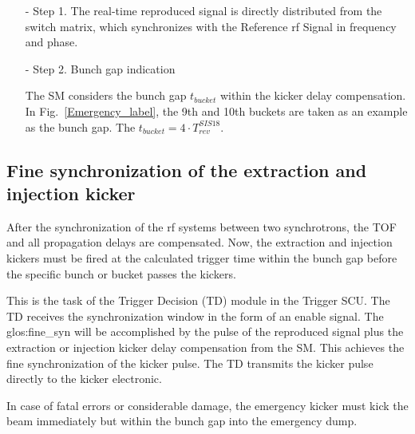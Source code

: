 \begin{itemize}
\begin{itemize}
\item[-] Step 1. The real-time reproduced signal is directly distributed from the switch matrix, which synchronizes with the Reference rf Signal in frequency and phase.
\item[-] Step 2. Bunch gap indication

The SM considers the bunch gap $t_{\mathit{bucket}}$ within the kicker delay compensation. In Fig.~\ref{Emergency_label}, the 9th and 10th buckets are taken as an example as the bunch gap. The $t_{\mathit{bucket}}=4\cdot T_{\mathit{rev}}^{\mathit{SIS18}}$.

\end{itemize}

\end{itemize}

\subsection{Fine synchronization of the extraction and injection kicker}
After the synchronization of the rf systems between two synchrotrons, the TOF and all propagation delays are compensated. Now, the extraction and injection kickers must be fired at the calculated trigger time within the bunch gap before the specific bunch or bucket passes the kickers.
 
This is the task of the Trigger Decision (TD) module in the Trigger SCU. The TD receives the  synchronization window in the form of an enable signal. The \gls{glos:fine_syn} will be accomplished by the pulse of the reproduced signal plus the extraction or injection kicker delay compensation from the SM. This achieves the fine synchronization of the kicker pulse. The TD transmits the kicker pulse directly to the kicker electronic.  
 
In case of fatal errors or considerable damage, the emergency kicker must kick the beam immediately but within the bunch gap into the emergency dump.



